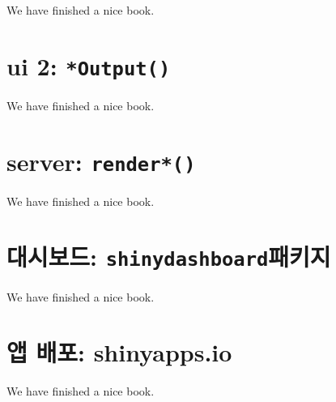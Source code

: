 \documentclass[]{book}
\begin{document}
We have finished a nice book.

\chapter{\texorpdfstring{ui 2:
\texttt{*Output()}}{ui 2: *Output()}}\label{ui2}

We have finished a nice book.

\chapter{\texorpdfstring{server:
\texttt{render*()}}{server: render*()}}\label{server}

We have finished a nice book.

\chapter{\texorpdfstring{대시보드:
\texttt{shinydashboard}패키지}{대시보드: shinydashboard패키지}}\label{dashboard}

We have finished a nice book.

\chapter{앱 배포: shinyapps.io}\label{deploy}

We have finished a nice book.


\end{document}
